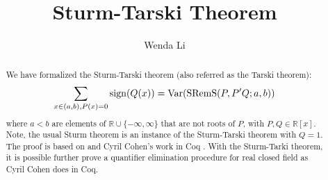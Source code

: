 \documentclass[11pt,a4paper]{article}
\begin{document}
\title{Sturm-Tarski Theorem}
\author{Wenda Li}
\maketitle

\begin{abstract}
  We have formalized the Sturm-Tarski theorem (also referred as the Tarski theorem): \[\sum_{x \in (a,b),P(x)=0} {\rm sign}(Q(x)) = {\rm Var}({\rm SRemS}(P,P'Q;a,b))\] 
  where $a<b$ are elements of $\mathbb{R} \cup \{-\infty,\infty\}$ that are not roots of $P$, with $P,Q \in \mathbb{R}[x]$. Note, 
  the usual Sturm theorem is an instance of the Sturm-Tarski theorem with $Q=1$. The proof is based on \cite{Basu:2006:ARA:1197095} and Cyril Cohen's work in Coq \cite{cohen_phd}. With the Sturm-Tarki theorem, it is possible further prove a quantifier elimination procedure for real closed field as Cyril Cohen does in Coq.
\end{abstract}






\end{document}
